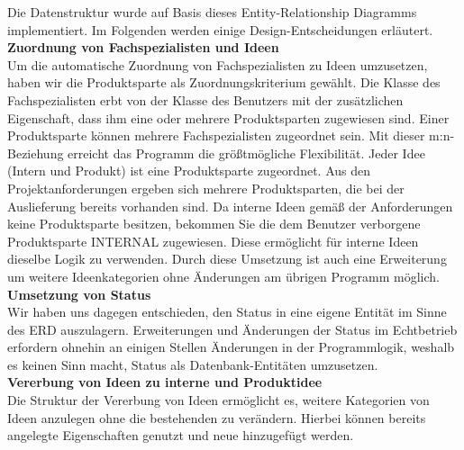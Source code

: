 Die Datenstruktur wurde auf Basis dieses Entity-Relationship Diagramms implementiert. Im Folgenden werden einige Design-Entscheidungen erläutert.\\
\textbf{Zuordnung von Fachspezialisten und Ideen}\\
Um die automatische Zuordnung von Fachspezialisten zu Ideen umzusetzen, haben wir die Produktsparte als Zuordnungskriterium gewählt.
Die Klasse des Fachspezialisten erbt von der Klasse des Benutzers mit der zusätzlichen Eigenschaft, dass ihm eine oder mehrere Produktsparten zugewiesen sind.
Einer Produktsparte können mehrere Fachspezialisten zugeordnet sein. Mit dieser m:n-Beziehung erreicht das Programm die größtmögliche Flexibilität.
Jeder Idee (Intern und Produkt) ist eine Produktsparte zugeordnet. Aus den Projektanforderungen ergeben sich mehrere Produktsparten, die bei der Auslieferung bereits vorhanden sind.
Da interne Ideen gemäß der Anforderungen keine Produktsparte besitzen, bekommen Sie die dem Benutzer verborgene Produktsparte \glqq{}INTERNAL\grqq{} zugewiesen. Diese ermöglicht für interne Ideen dieselbe Logik zu verwenden.
Durch diese Umsetzung ist auch eine Erweiterung um weitere Ideenkategorien ohne Änderungen am übrigen Programm möglich.\\
\textbf{Umsetzung von Status}\\
Wir haben uns dagegen entschieden, den Status in eine eigene Entität im Sinne des ERD auszulagern.
Erweiterungen und Änderungen der Status im Echtbetrieb erfordern ohnehin an einigen Stellen Änderungen in der Programmlogik, weshalb es keinen Sinn macht, Status als Datenbank-Entitäten umzusetzen.\\
\textbf{Vererbung von Ideen zu interne und Produktidee}\\
Die Struktur der Vererbung von Ideen ermöglicht es, weitere Kategorien von Ideen anzulegen ohne die bestehenden zu verändern. Hierbei können bereits angelegte Eigenschaften genutzt und neue hinzugefügt werden. 
